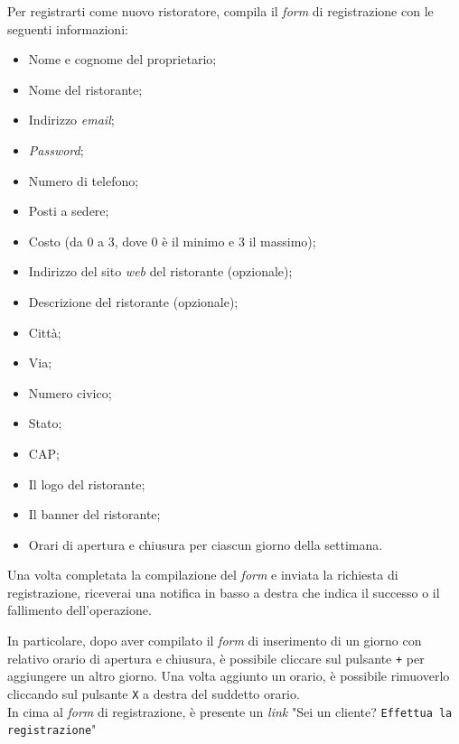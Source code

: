 Per registrarti come nuovo ristoratore, compila il \textit{form} di registrazione con le
seguenti informazioni:
\begin{itemize}
	\item Nome e cognome del proprietario;
	\item Nome del ristorante;
	\item Indirizzo \textit{email};
	\item \textit{Password};
	\item Numero di telefono;
	\item Posti a sedere;
	\item Costo (da 0 a 3, dove 0 è il minimo e 3 il massimo);
	\item Indirizzo del sito \textit{web} del ristorante (opzionale);
	\item Descrizione del ristorante (opzionale);
	\item Città;
	\item Via;
	\item Numero civico;
	\item Stato;
	\item CAP;
	\item Il logo del ristorante;
	\item Il banner del ristorante;
	\item Orari di apertura e chiusura per ciascun giorno della settimana.
\end{itemize}

Una volta completata la compilazione del \textit{form} e inviata la richiesta di registrazione, riceverai 
una notifica in basso a destra che indica il successo o il fallimento
dell'operazione.

In particolare, dopo aver compilato il \textit{form} di inserimento di un giorno con
relativo orario di apertura e chiusura, è possibile cliccare sul pulsante
\texttt{+} per aggiungere un altro giorno. Una volta aggiunto un orario, è
possibile rimuoverlo cliccando sul pulsante \texttt{X} a destra del suddetto
orario.\\
In cima al \textit{form} di registrazione, è presente un \textit{link} "Sei un cliente? \texttt{Effettua la registrazione}"

